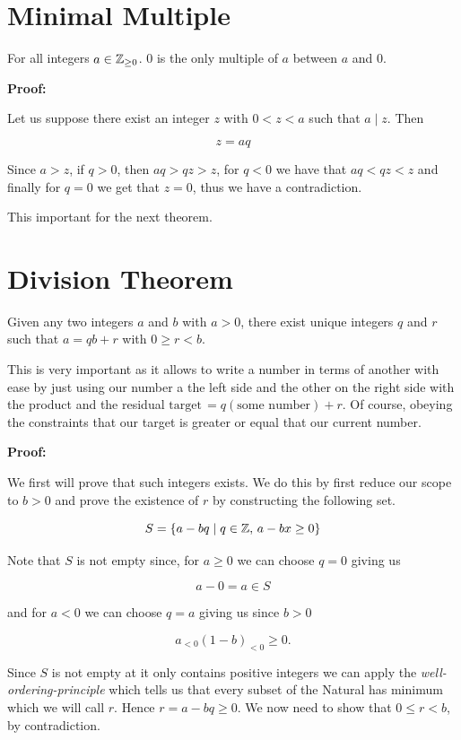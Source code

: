 \section{Minimal Multiple}

For all integers \(a \in \mathbb{Z}_{\ge 0}\). 0 is the only multiple of \(a\) between \(a\) and 0.

\textbf{Proof:}

Let us suppose there exist an integer \(z\) with \(0 < z < a\) such that \(a \mid z\). Then

\[
	z = aq
\]

Since \(a > z\), if \(q > 0\), then \(aq > qz > z\), for \(q < 0\) we have that \(aq < qz < z\) and finally
for \(q = 0\) we get that \(z = 0\), thus we have a contradiction.

\QED

This important for the next theorem.

\section{Division Theorem}

Given any two integers \(a\) and \(b\) with \(a > 0\), there exist unique integers \(q\) and \(r\) such that
\(a = qb + r\) with \(0 \ge r < b\).

This is very important as it allows to write a number in terms of another with ease by just using our number a the left side and the other on the right side with
the product and the residual \(\text{target}\, = q(\text{some number}) + r\). Of course, obeying the constraints that our target is greater or equal that our current number.

\textbf{Proof:}

We first will prove that such integers exists. We do this by first reduce our scope to \(b > 0\) and prove the
existence of \(r\) by constructing the following set.

\[
	S = \{a - bq \mid q \in \mathbb{Z}, \, a - bx \ge 0\}
\]

Note that \(S\) is not empty since, for \(a \ge 0\) we can choose \(q = 0\) giving us

\[
	a - 0 = a \in S
\]

and for \(a < 0\) we can choose \(q = a\) giving us since \(b > 0\)

\[
	a_{< 0}(1 - b)_{< 0} \ge 0.
\]

Since \(S\) is not empty at it only contains positive integers we can apply the \emph{well-ordering-principle} which tells us that
every subset of the Natural has minimum which we will call \(r\). Hence \(r = a - bq \ge 0\). We now need to
show that \(0 \le r < b\), by contradiction.

